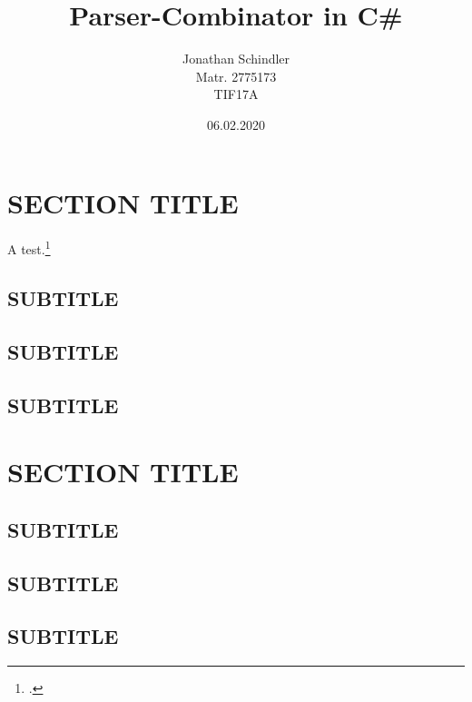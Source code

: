 \documentclass[12pt]{article}
\title{Parser-Combinator in C\#}
\author{Jonathan Schindler \\ Matr. 2775173 \\ TIF17A}
\date{06.02.2020}
\begin{document}
	
	\newpage
	\tableofcontents
	\newpage
	
	\section{SECTION TITLE}
		
	A test.\footcite{krause}
	
	\subsection{SUBTITLE}
		
	
	\subsection{SUBTITLE} 
	
	
	\subsection{SUBTITLE}
	
	
	\newpage
	
	\section{SECTION TITLE}

	
	\subsection{SUBTITLE}

	
	\subsection{SUBTITLE}
	
	
	\subsection{SUBTITLE}
	
\end{document}
